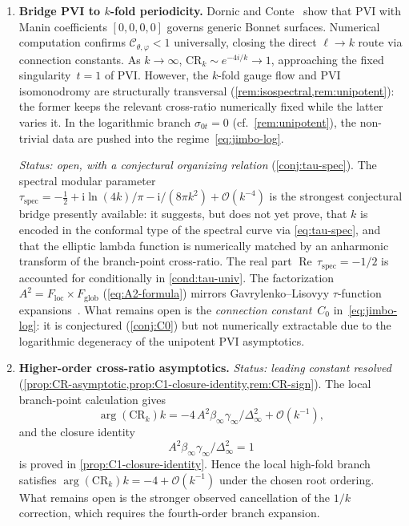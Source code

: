 \documentclass[11pt,a4paper]{article}
\theoremstyle{plain}
\theoremstyle{definition}
\theoremstyle{remark}
\DeclareMathOperator{\Real}{Re}
\newcommand{\ii}{\mathrm{i}}
\newcommand{\Oo}{\mathcal{O}}
\begin{document}
\begin{enumerate}[label=\textbf{OP\arabic*.},nosep]
\item \textbf{Bridge PVI to $k$-fold periodicity.}
  Dornic and Conte~\cite{DC26} show that PVI with Manin
  coefficients $[0,0,0,0]$ governs generic Bonnet surfaces.
  Numerical computation confirms
  $\mathcal{C}_{\theta,\varphi}<1$ universally, closing
  the direct $\ell\to k$ route via connection constants.
  As $k\to\infty$, $\mathrm{CR}_k \sim e^{-4i/k}\to 1$,
  approaching the fixed singularity~$t=1$ of PVI.
  However, the $k$-fold gauge flow and PVI isomonodromy
  are structurally transversal
  (\cref{rem:isospectral,rem:unipotent}): the former
  keeps the relevant cross-ratio numerically fixed while the latter varies it.
  In the logarithmic branch $\sigma_{0t}=0$
  (cf.\ \cref{rem:unipotent}), the non-trivial data are pushed into
  the regime~\eqref{eq:jimbo-log}.

  \emph{Status: open, with a conjectural organizing relation}
  (\cref{conj:tau-spec}).
  The spectral modular parameter
  $\tau_{\mathrm{spec}} = -\tfrac12 + \ii\ln(4k)/\pi
  - \ii/(8\pi k^2) + \Oo(k^{-4})$
  is the strongest conjectural bridge presently available: it suggests,
  but does not yet prove, that $k$ is encoded in the conformal type of
  the spectral curve via \eqref{eq:tau-spec}, and that the elliptic
  lambda function is numerically matched by an anharmonic transform of
  the branch-point cross-ratio.
  The real part $\Real\,\tau_{\mathrm{spec}} = -1/2$ is
  accounted for conditionally in \cref{cond:tau-univ}.
  The factorization $A^2 = F_{\mathrm{loc}} \times
  F_{\mathrm{glob}}$ (\cref{eq:A2-formula}) mirrors
  Gavrylenko--Lisovyy $\tau$-function
  expansions~\cite{GL18,GIL12}.
  What remains open is the \emph{connection constant}~$C_0$
  in~\eqref{eq:jimbo-log}: it is conjectured
  (\cref{conj:C0}) but not numerically extractable due to
  the logarithmic degeneracy of the unipotent PVI
  asymptotics.

\item \textbf{Higher-order cross-ratio asymptotics.}
  \emph{Status: leading constant resolved}
  (\cref{prop:CR-asymptotic,prop:C1-closure-identity,rem:CR-sign}).
  The local branch-point calculation gives
  \[
    \arg(\mathrm{CR}_k)k
    =
    -4\,A^2\beta_\infty\gamma_\infty/\Delta_\infty^2
    +\Oo(k^{-1}),
  \]
  and the closure identity
  \[
    A^2\beta_\infty\gamma_\infty/\Delta_\infty^2=1
  \]
  is proved in \cref{prop:C1-closure-identity}.  Hence the local
  high-fold branch satisfies
  $\arg(\mathrm{CR}_k)k=-4+\Oo(k^{-1})$ under the chosen root ordering.
  What remains open is the stronger observed cancellation of the
  $1/k$ correction, which requires the fourth-order branch expansion.


\end{enumerate}
\end{document}
